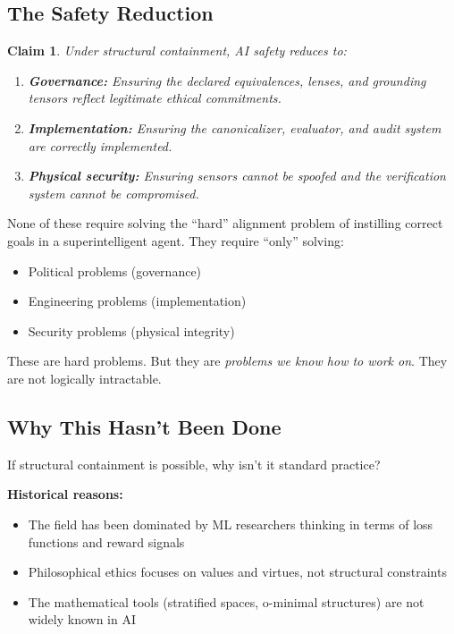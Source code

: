 \documentclass[12pt]{article}
\newtheorem{claim}{Claim}[section]
\theoremstyle{definition}
\begin{document}
\subsection{The Safety Reduction}

\begin{claim}
Under structural containment, AI safety reduces to:
\begin{enumerate}
    \item \textbf{Governance:} Ensuring the declared equivalences, lenses, and grounding tensors reflect legitimate ethical commitments.
    \item \textbf{Implementation:} Ensuring the canonicalizer, evaluator, and audit system are correctly implemented.
    \item \textbf{Physical security:} Ensuring sensors cannot be spoofed and the verification system cannot be compromised.
\end{enumerate}
\end{claim}

None of these require solving the ``hard'' alignment problem of instilling correct goals in a superintelligent agent. They require ``only'' solving:
\begin{itemize}
    \item Political problems (governance)
    \item Engineering problems (implementation)
    \item Security problems (physical integrity)
\end{itemize}

These are hard problems. But they are \emph{problems we know how to work on}. They are not logically intractable.

\subsection{Why This Hasn't Been Done}

If structural containment is possible, why isn't it standard practice?

\textbf{Historical reasons:}
\begin{itemize}
    \item The field has been dominated by ML researchers thinking in terms of loss functions and reward signals
    \item Philosophical ethics focuses on values and virtues, not structural constraints
    \item The mathematical tools (stratified spaces, o-minimal structures) are not widely known in AI
\end{itemize}
\end{document}
